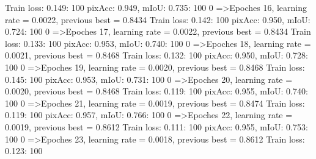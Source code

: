 Train loss: 0.149: 100%
pixAcc: 0.949, mIoU: 0.735: 100%
  0%
=>Epoches 16, learning rate = 0.0022,                 previous best = 0.8434
Train loss: 0.142: 100%
pixAcc: 0.950, mIoU: 0.724: 100%
  0%
=>Epoches 17, learning rate = 0.0022,                 previous best = 0.8434
Train loss: 0.133: 100%
pixAcc: 0.953, mIoU: 0.740: 100%
  0%
=>Epoches 18, learning rate = 0.0021,                 previous best = 0.8468
Train loss: 0.132: 100%
pixAcc: 0.950, mIoU: 0.728: 100%
  0%
=>Epoches 19, learning rate = 0.0020,                 previous best = 0.8468
Train loss: 0.145: 100%
pixAcc: 0.953, mIoU: 0.731: 100%
  0%
=>Epoches 20, learning rate = 0.0020,                 previous best = 0.8468
Train loss: 0.119: 100%
pixAcc: 0.955, mIoU: 0.740: 100%
  0%
=>Epoches 21, learning rate = 0.0019,                 previous best = 0.8474
Train loss: 0.119: 100%
pixAcc: 0.957, mIoU: 0.766: 100%
  0%
=>Epoches 22, learning rate = 0.0019,                 previous best = 0.8612
Train loss: 0.111: 100%
pixAcc: 0.955, mIoU: 0.753: 100%
  0%
=>Epoches 23, learning rate = 0.0018,                 previous best = 0.8612
Train loss: 0.123: 100%
